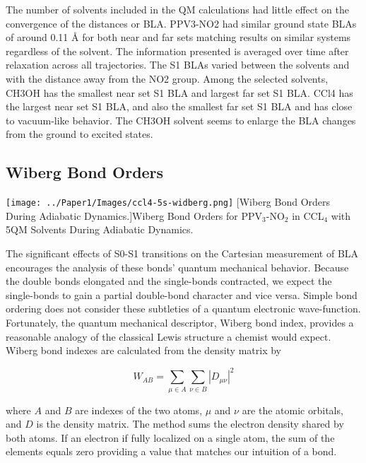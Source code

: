 	The number of solvents included in the QM calculations had little effect on the convergence of the distances or BLA.
	PPV3-NO2 had similar ground state BLAs of around 0.11 Å for both near and far sets matching results on similar systems regardless of the solvent. \cite{nelson2011nonadiabatic}
	The information presented is averaged over time after relaxation across all trajectories.
	The S1 BLAs varied between the solvents and with the distance away from the NO2 group.
	Among the selected solvents, CH3OH has the smallest near set S1 BLA and largest far set S1 BLA.
	CCl4 has the largest near set S1 BLA, and also the smallest far set S1 BLA and has close to vacuum-like behavior.
	The CH3OH solvent seems to enlarge the BLA changes from the ground to excited states.

\subsection{Wiberg Bond Orders}
\begin{minipage}[c]{\textwidth}
\centering
\texttt{[image: ../Paper1/Images/ccl4-5s-widberg.png]}
[Wiberg Bond Orders During Adiabatic Dynamics.]{Wiberg Bond Orders for PPV\(_3\)-NO\(_2\) in CCL\(_4\) with 5QM Solvents During Adiabatic Dynamics. }
\label{fig:bondOrdersAdiabatic}
\end{minipage}\bigskip


    The significant effects of S0-S1 transitions on the Cartesian measurement of BLA encourages the analysis of these bonds' quantum mechanical behavior.
    Because the double bonds elongated and the single-bonds contracted, we expect the single-bonds to gain a partial double-bond character and vice versa.
    Simple bond ordering does not consider these subtleties of a quantum electronic wave-function.
    Fortunately, the quantum mechanical descriptor, Wiberg bond index, provides a reasonable analogy of the classical Lewis structure a chemist would expect.
    Wiberg bond indexes are calculated from the density matrix by 

    \begin{equation}
    W_{AB} = \sum_{\mu\in A}\sum_{\nu \in B} | D_{\mu\nu} |^2
    \end{equation}

    where \(A\) and \(B\) are indexes of the two atoms, \(\mu\) and \(\nu\) are the atomic orbitals, and \(D\) is the density matrix.
    The method sums the electron density shared by both atoms.
    If an electron if fully localized on a single atom, the sum of the elements equals zero providing a value that matches our intuition of a bond. 

